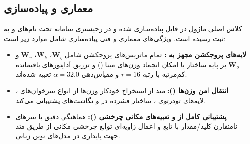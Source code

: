 \subsection{معماری و پیاده‌سازی}
کلاس اصلی ماژول  در فایل  پیاده‌سازی شده و در رجیستری سامانه تحت نام‌های  و  به ثبت رسیده است. ویژگی‌های معماری و فنی پیاده‌سازی شامل موارد زیر است:
\begin{itemize}
    \item \textbf{لایه‌های پروجکشن مجهز به :} تمام ماتریس‌های پروجکشن شامل $\mathbf{W}_q$، $\mathbf{W}_k$، $\mathbf{W}_v$ و $\mathbf{W}_o$ بر پایه ساختار  با امکان انجماد وزن‌های مبنا () و تزریق آداپتورهای باقیمانده کم‌مرتبه با رتبه $r=16$ و مقیاس‌دهی $\alpha=32.0$ تعبیه شده‌اند.
    \item \textbf{انتقال امن وزن‌ها ():} متد  از استخراج خودکار وزن‌ها از انواع سرخوان‌های ، لایه‌های تودرتوی ، ساختار فشرده  در  و نگاشت‌های  پشتیبانی می‌کند.
    \item \textbf{پشتیبانی کامل از  و تعبیه‌های مکانی چرخشی ():} هماهنگی دقیق با سرهای نامتقارن کلید/مقدار با تابع  و اعمال زاویه‌ای توابع چرخشی مکانی از طریق متد  جهت پایداری در مدل‌های نوین زبانی.
\end{itemize}
